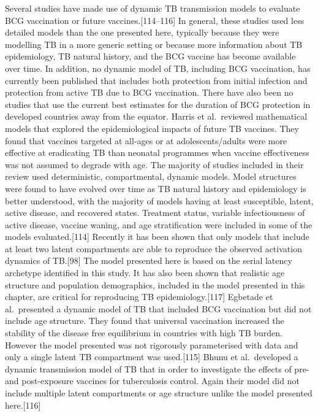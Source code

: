 \documentclass[11pt,twoside]{bristolthesis}
\begin{document}
  Several studies have made use of dynamic TB transmission models to evaluate BCG vaccination or future vaccines.{[}114--116{]} In general, these studies used less detailed models than the one presented here, typically because they were modelling TB in a more generic setting or because more information about TB epidemiology, TB natural history, and the BCG vaccine has become available over time. In addition, no dynamic model of TB, including BCG vaccination, has currently been published that includes both protection from initial infection and protection from active TB due to BCG vaccination. There have also been no studies that use the current best estimates for the duration of BCG protection in developed countries away from the equator. Harris et al.~reviewed mathematical models that explored the epidemiological impacts of future TB vaccines. They found that vaccines targeted at all-ages or at adolescents/adults were more effective at eradicating TB than neonatal programmes when vaccine effectiveness was not assumed to degrade with age. The majority of studies included in their review used deterministic, compartmental, dynamic models. Model structures were found to have evolved over time as TB natural history and epidemiology is better understood, with the majority of models having at least susceptible, latent, active disease, and recovered states. Treatment status, variable infectiousness of active disease, vaccine waning, and age stratification were included in some of the models evaluated.{[}114{]} Recently it has been shown that only models that include at least two latent compartments are able to reproduce the observed activation dynamics of TB.{[}98{]} The model presented here is based on the serial latency archetype identified in this study. It has also been shown that realistic age structure and population demographics, included in the model presented in this chapter, are critical for reproducing TB epidemiology.{[}117{]} Egbetade et al.~presented a dynamic model of TB that included BCG vaccination but did not include age structure. They found that universal vaccination increased the stability of the disease free equilibrium in countries with high TB burden. However the model presented was not rigorously parameterised with data and only a single latent TB compartment was used.{[}115{]} Bhunu et al.~developed a dynamic transmission model of TB that in order to investigate the effects of pre- and post-exposure vaccines for tuberculosis control. Again their model did not include multiple latent compartments or age structure unlike the model presented here.{[}116{]}
  
\end{document}
